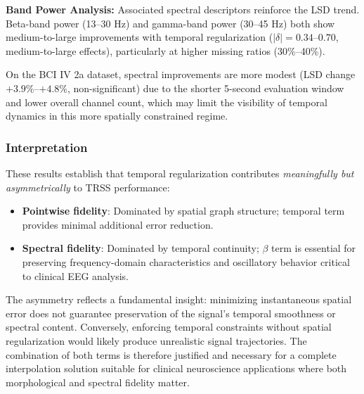 \textbf{Band Power Analysis:} Associated spectral descriptors reinforce the LSD trend. Beta-band power (13--30 Hz) and gamma-band power (30--45 Hz) both show medium-to-large improvements with temporal regularization ($|\delta| = 0.34$--$0.70$, medium-to-large effects), particularly at higher missing ratios (30\%--40\%).

On the BCI IV 2a dataset, spectral improvements are more modest (LSD change $+3.9\%$--$+4.8\%$, non-significant) due to the shorter 5-second evaluation window and lower overall channel count, which may limit the visibility of temporal dynamics in this more spatially constrained regime.

\subsubsection{Interpretation}

These results establish that temporal regularization contributes \textit{meaningfully but asymmetrically} to TRSS performance:

\begin{itemize}
  \item \textbf{Pointwise fidelity}: Dominated by spatial graph structure; temporal term provides minimal additional error reduction.
  \item \textbf{Spectral fidelity}: Dominated by temporal continuity; $\beta$ term is essential for preserving frequency-domain characteristics and oscillatory behavior critical to clinical EEG analysis.
\end{itemize}

The asymmetry reflects a fundamental insight: minimizing instantaneous spatial error does not guarantee preservation of the signal's temporal smoothness or spectral content. Conversely, enforcing temporal constraints without spatial regularization would likely produce unrealistic signal trajectories. The combination of both terms is therefore justified and necessary for a complete interpolation solution suitable for clinical neuroscience applications where both morphological and spectral fidelity matter.
